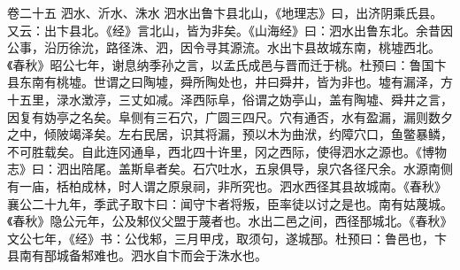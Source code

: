 \documentclass[12pt,UTF8]{ctexbook}
\begin{document}
卷二十五  泗水、沂水、洙水 
泗水出鲁卞县北山，《地理志》曰，出济阴乘氏县。又云：出卞县北。《经》言北山，皆为非矣。《山海经》曰：泗水出鲁东北。余昔因公事，沿历徐沇，路径洙、泗，因令寻其源流。水出卞县故城东南，桃墟西北。《春秋》昭公七年，谢息纳季孙之言，以孟氏成邑与晋而迁于桃。杜预曰：鲁国卞县东南有桃墟。世谓之曰陶墟，舜所陶处也，井曰舜井，皆为非也。墟有漏泽，方十五里，渌水澂渟，三丈如减。泽西际阜，俗谓之妫亭山，盖有陶墟、舜井之言，因复有妫亭之名矣。阜侧有三石穴，广圆三四尺。穴有通否，水有盈漏，漏则数夕之中，倾陂竭泽矣。左右民居，识其将漏，预以木为曲洑，约障穴口，鱼鳖暴鳞，不可胜载矣。自此连冈通阜，西北四十许里，冈之西际，使得泗水之源也。《博物志》曰：泗出陪尾。盖斯阜者矣。石穴吐水，五泉俱导，泉穴各径尺余。水源南侧有一庙，栝柏成林，时人谓之原泉祠，非所究也。泗水西径其县故城南。《春秋》襄公二十九年，季武子取卞曰：闻守卞者将叛，臣率徒以讨之是也。南有姑蔑城。《春秋》隐公元年，公及邾仪父盟于蔑者也。水出二邑之间，西径郚城北。《春秋》文公七年，《经》书：公伐邾，三月甲戌，取须句，遂城郚。杜预曰：鲁邑也，卞县南有郚城备邾难也。泗水自卞而会于洙水也。
\end{document}

